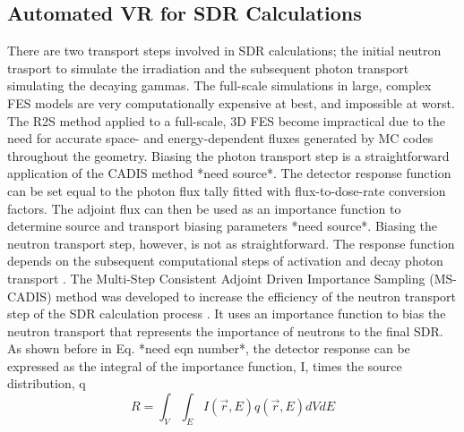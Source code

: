 \subsection{Automated VR for SDR Calculations}
There are two transport steps involved in SDR calculations; the initial
neutron trasport to simulate the irradiation and the subsequent photon
transport simulating the decaying gammas.  The full-scale simulations in
large, complex FES models are very computationally expensive at best, and
impossible at worst.
The R2S method applied to a full-scale, 3D FES become impractical due to the
need for accurate space- and energy-dependent fluxes generated by MC codes 
throughout the geometry.  Biasing the photon transport step is a
straightforward application of the CADIS method *need source*.  The detector
response function  can be set equal to the photon flux tally fitted with
flux-to-dose-rate conversion factors.  The adjoint flux can then be used as an
importance function to determine source and transport biasing parameters *need
source*.  Biasing the neutron transport step, however, is not as
straightforward.  The response function depends on the subsequent
computational steps of activation and decay photon transport \cite{Ibrahim_2015}.
The Multi-Step Consistent Adjoint Driven Importance Sampling (MS-CADIS) method
was developed to increase the efficiency of the neutron transport step of the
SDR calculation process \cite{Ibrahim_2015}.  It uses an importance function
to bias the neutron transport that represents the importance of neutrons to
the final SDR.
As shown before in Eq. *need eqn number*, the detector response can be
expressed as the integral of the importance function, I, times the source
distribution, q
\begin{equation} \label{eq:4.1}
R = \int_{V}\int_{E} 
    I(\overrightarrow{r}, E)
    q(\overrightarrow{r}, E)
    dV dE
\end{equation}
 
